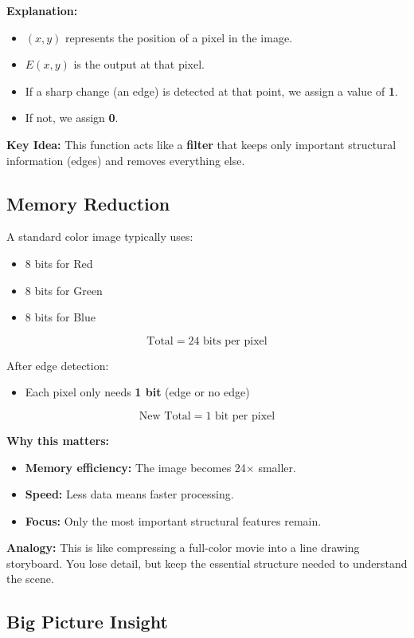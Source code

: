 \documentclass[12pt]{article}
\begin{document}
\textbf{Explanation:}
\begin{itemize}
    \item $(x,y)$ represents the position of a pixel in the image.
    \item $E(x,y)$ is the output at that pixel.
    \item If a sharp change (an edge) is detected at that point, we assign a value of \textbf{1}.
    \item If not, we assign \textbf{0}.
\end{itemize}

\textbf{Key Idea:}
This function acts like a \textbf{filter} that keeps only important structural information (edges) and removes everything else.

\subsection{Memory Reduction}

A standard color image typically uses:
\begin{itemize}
    \item 8 bits for Red
    \item 8 bits for Green
    \item 8 bits for Blue
\end{itemize}

\[
    \text{Total} = 24 \text{ bits per pixel}
\]

After edge detection:
\begin{itemize}
    \item Each pixel only needs \textbf{1 bit} (edge or no edge)
\end{itemize}

\[
    \text{New Total} = 1 \text{ bit per pixel}
\]

\textbf{Why this matters:}
\begin{itemize}
    \item \textbf{Memory efficiency:} The image becomes 24$\times$ smaller.
    \item \textbf{Speed:} Less data means faster processing.
    \item \textbf{Focus:} Only the most important structural features remain.
\end{itemize}

\textbf{Analogy:}
This is like compressing a full-color movie into a line drawing storyboard. You lose detail, but keep the essential structure needed to understand the scene.

\subsection{Big Picture Insight}
\end{document}

